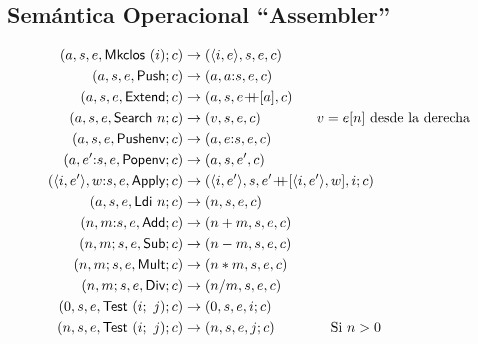 \documentclass[twoside,a4paper,12pt]{article}
\theoremstyle{definition}
\theoremstyle{remark}
\begin{document}
\subsection*{Semántica Operacional ``Assembler''}

\begin{align*}
  (a, s, e, \Mkclos i; c)                   & \to (\thunk ie, s, e, c)    \\
  (a, s, e, \Push; c)                       & \to (a, a{\append}s, e, c)  \\
  (a, s, e, \Extend; c)                     & \to (a, s, e\concat [a], c) \\
  (a, s, e, \Search n; c)                   & \to (v, s, e, c)   \qquad\qquad v = e[n] \textrm{ desde la derecha}\\
  (a, s, e, \Pushenv; c)                    & \to (a, e{\append}s, e, c)  \\
  (a, e'{\append}s, e, \Popenv; c)          & \to (a, s, e',c)   \\
  (\thunk i{e'}, w{\append}s, e, \Apply; c) & \to (\thunk i{e'}, s, e'\concat [\thunk i{e'},w], i; c)\\
  (a, s, e, \Ldi n; c)                      & \to (n, s, e, c)    \\
  (n, m{\append}s, e, \Add; c)              & \to (n+m, s, e, c)  \\
  (n, m; s, e, \Sub; c)                     & \to (n-m, s, e, c)  \\
  (n, m; s, e, \Mult; c)                    & \to (n*m, s, e, c)  \\
  (n, m; s, e, \Div; c)                     & \to (n/m, s, e, c)  \\
  (0, s, e, \Test i j; c)                   & \to (0, s, e, i; c) \\
  (n, s, e, \Test i j; c)                   & \to (n, s, e,j; c) \qquad\qquad \textrm{Si }n>0 
\end{align*}


\newpage
\end{document}
